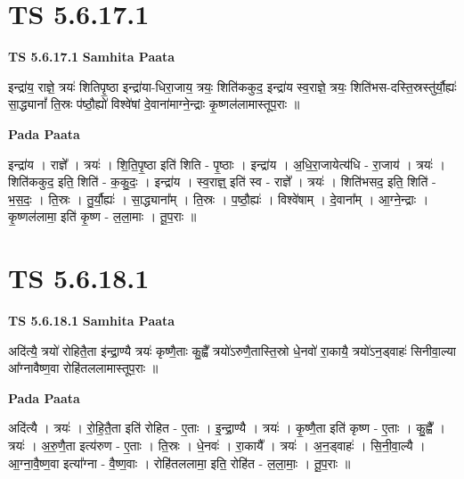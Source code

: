 \documentclass[17pt]{extarticle}
\begin{document}
\section*{ TS 5.6.17.1 }

\textbf{TS 5.6.17.1 } \newline
\textbf{Samhita Paata} \newline

इन्द्रा॑य॒ राज्ञे॒ त्रयः॑ शितिपृ॒ष्ठा इन्द्रा॑या-धिरा॒जाय॒ त्रयः॒ शिति॑ककुद॒ इन्द्रा॑य स्व॒राज्ञे॒ त्रयः॒ शिति॑भस-दस्ति॒स्रस्तु॑र्यौ॒ह्यः॑ सा॒द्ध्यानां᳚ ति॒स्रः प॑ष्ठौ॒ह्यो॑ विश्वे॑षां दे॒वाना॑माग्ने॒न्द्राः कृ॒ष्णल॑लामास्तूप॒राः ॥ \newline

\textbf{Pada Paata} \newline

इन्द्रा॑य । राज्ञे᳚ । त्रयः॑ । शि॒ति॒पृ॒ष्ठा इति॑ शिति - पृ॒ष्ठाः । इन्द्रा॑य । अ॒धि॒रा॒जायेत्य॑धि - रा॒जाय॑ । त्रयः॑ । शिति॑ककुद॒ इति॒ शिति॑ - क॒कु॒दः॒ । इन्द्रा॑य । स्व॒राज्ञ्॒ इति॑ स्व - राज्ञे᳚ । त्रयः॑ । शिति॑भसद॒ इति॒ शिति॑ - भ॒स॒दः॒ । ति॒स्रः । तु॒र्यौ॒ह्यः॑ । सा॒द्ध्याना᳚म् । ति॒स्रः । प॒ष्ठौ॒ह्यः॑ । विश्वे॑षाम् । दे॒वाना᳚म् । आ॒ग्ने॒न्द्राः । कृ॒ष्णल॑लामा॒ इति॑ कृ॒ष्ण - ल॒ला॒माः । तू॒प॒राः ॥  \newline




\section*{ TS 5.6.18.1 }

\textbf{TS 5.6.18.1 } \newline
\textbf{Samhita Paata} \newline

अदि॑त्यै॒ त्रयो॑ रोहितै॒ता इ॑न्द्रा॒ण्यै त्रयः॑ कृष्णै॒ताः कु॒ह्वै᳚ त्रयो॑ऽरुणै॒तास्ति॒स्रो धे॒नवो॑ रा॒कायै॒ त्रयो॑ऽन॒ड्वाहः॑ सिनीवा॒ल्या आ᳚ग्नावैष्ण॒वा रोहि॑तललामास्तूप॒राः ॥ \newline

\textbf{Pada Paata} \newline

अदि॑त्यै । त्रयः॑ । रो॒हि॒तै॒ता इति॑ रोहित - ए॒ताः । इ॒न्द्रा॒ण्यै । त्रयः॑ । कृ॒ष्णै॒ता इति॑ कृष्ण - ए॒ताः । कु॒ह्वै᳚ । त्रयः॑ । अ॒रु॒णै॒ता इत्य॑रुण - ए॒ताः । ति॒स्रः । धे॒नवः॑ । रा॒कायै᳚ । त्रयः॑ । अ॒न॒ड्वाहः॑ । सि॒नी॒वा॒ल्यै । आ॒ग्ना॒वै॒ष्ण॒वा इत्या᳚ग्ना - वै॒ष्ण॒वाः । रोहि॑तललामा॒ इति॒ रोहि॑त - ल॒ला॒माः॒ । तू॒प॒राः ॥  \newline
\end{document}
